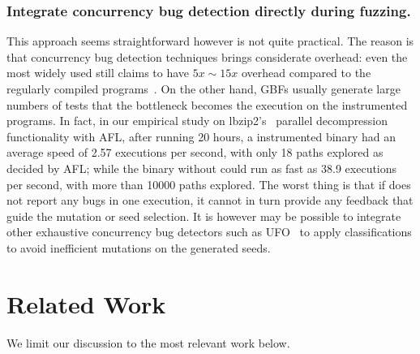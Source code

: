 \subsubsection{Integrate concurrency bug detection directly during fuzzing.}\label{sec:discuss_ts_cbugs}
This approach seems straightforward however is not quite practical. The reason is that concurrency bug detection techniques brings considerate overhead: even the most widely used \ts still claims to have $5x\sim 15x$ overhead compared to the regularly compiled programs~\cite{kcc:tsan,lwn_tsan}. On the other hand, GBFs usually generate large numbers of tests that the bottleneck becomes the execution on the \ts instrumented programs. In fact, in our empirical study on lbzip2's~\cite{lbzip2} parallel decompression functionality with AFL, after running 20 hours, a \ts instrumented binary had an average speed of 2.57 executions per second, with only 18 paths explored as decided by AFL; while the binary without \ts could run as fast as 38.9 executions per second, with more than 10000 paths explored. The worst thing is that if \ts does not report any bugs in one execution, it cannot in turn provide any feedback that guide the mutation or seed selection. It is however may be possible to integrate other exhaustive concurrency bug detectors such as UFO~\cite{icse18_ufo} to apply classifications to avoid inefficient mutations on the generated seeds.













 \section{Related Work}
We limit our discussion to the most relevant work below.


